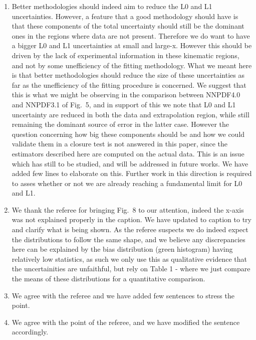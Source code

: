 \documentclass[11pt,a4paper]{article}
\numberwithin{equation}{section}
\numberwithin{figure}{section}
\numberwithin{table}{section}
\begin{document}
\begin{enumerate}
    \item Better methodologies should indeed aim to reduce the L0 and L1 uncertainties.
    However, a feature that a good methodology should have is that these components of the total uncertainty should
    still be the dominant ones in the regions where data are not present.
    Therefore we do want to have a bigger L0 and L1 uncertainties at small and large-x.
    However this should be driven by the lack of experimental information in these kinematic regions,
    and not by some unefficiency of the fitting methodology. What we meant here is that better methodologies 
    should reduce the size of these uncertainties as far as the unefficiency of the fitting procedure
    is concerned. We suggest that this is what we might be observing in the comparison
    between NNPDF4.0 and NNPDF3.1 of Fig.~5, and in support of this we note that L0 and L1 uncertainty
    are reduced in both the data and extrapolation region, while still remaining the dominant source of 
    error in the latter case.    
    However the question concerning how big these components should be and how we could validate them 
    in a closure test is not answered in this paper, since the estimators described here 
    are computed on the actual data.
    This is an issue which has still to be studied, and will be addressed in future works.
    We have added few lines to elaborate on this. Further work in this direction is required to 
    asses whether or not we are already reaching a fundamental limit for L0 and L1.
    \item We thank the referee for bringing Fig.~8 to our attention, indeed the x-axis was
    not explained properly in the caption. We have updated to caption to try and clarify what is being shown.
    As the referee suspects we do indeed expect the distributions to follow the same shape, and we believe
    any discrepancies here can be explained by the bias distribution (green histogram)
    having relatively low statistics, as such we only use this as qualitative evidence
    that the uncertainities are unfaithful, but rely on Table 1 - where we just compare the means of these
    distributions for a quantitative comparison.
    \item We agree with the referee and we have added few sentences to stress the point.
    \item We agree with the point of the referee, and we have modified the sentence accordingly.
\end{enumerate}





%
%
\end{document}
